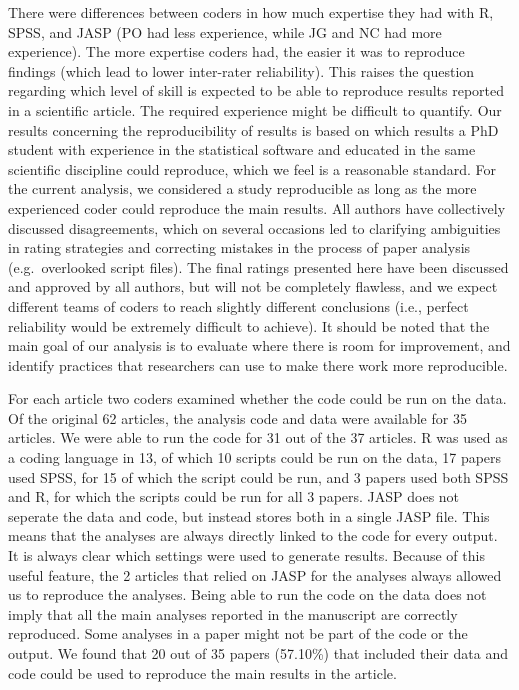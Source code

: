 \documentclass[,jou, a4paper,floatsintext]{apa6}
\begin{document}
There were differences between coders in how much expertise they had with R, SPSS, and JASP (PO had less experience, while JG and NC had more experience). The more expertise coders had, the easier it was to reproduce findings (which lead to lower inter-rater reliability). This raises the question regarding which level of skill is expected to be able to reproduce results reported in a scientific article. The required experience might be difficult to quantify. Our results concerning the reproducibility of results is based on which results a PhD student with experience in the statistical software and educated in the same scientific discipline could reproduce, which we feel is a reasonable standard. For the current analysis, we considered a study reproducible as long as the more experienced coder could reproduce the main results. All authors have collectively discussed disagreements, which on several occasions led to clarifying ambiguities in rating strategies and correcting mistakes in the process of paper analysis (e.g.~overlooked script files). The final ratings presented here have been discussed and approved by all authors, but will not be completely flawless, and we expect different teams of coders to reach slightly different conclusions (i.e., perfect reliability would be extremely difficult to achieve). It should be noted that the main goal of our analysis is to evaluate where there is room for improvement, and identify practices that researchers can use to make there work more reproducible.

For each article two coders examined whether the code could be run on the data. Of the original 62 articles, the analysis code and data were available for 35 articles. We were able to run the code for 31 out of the 37 articles. R was used as a coding language in 13, of which 10 scripts could be run on the data, 17 papers used SPSS, for 15 of which the script could be run, and 3 papers used both SPSS and R, for which the scripts could be run for all 3 papers. JASP does not seperate the data and code, but instead stores both in a single JASP file. This means that the analyses are always directly linked to the code for every output. It is always clear which settings were used to generate results. Because of this useful feature, the 2 articles that relied on JASP for the analyses always allowed us to reproduce the analyses. Being able to run the code on the data does not imply that all the main analyses reported in the manuscript are correctly reproduced. Some analyses in a paper might not be part of the code or the output. We found that 20 out of 35 papers (57.10\%) that included their data and code could be used to reproduce the main results in the article.
\end{document}
